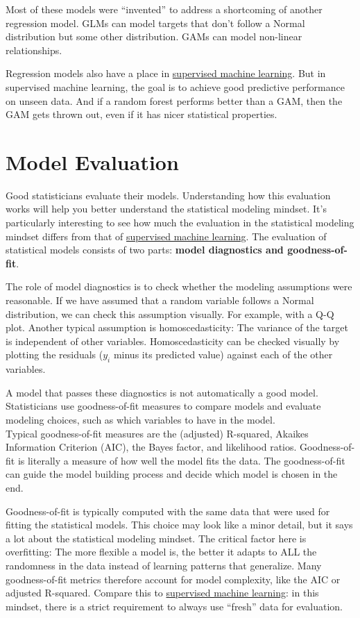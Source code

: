 \documentclass[
  10pt,
]{scrbook}
\begin{document}
Most of these models were ``invented'' to address a shortcoming of another regression model.
GLMs can model targets that don't follow a Normal distribution but some other distribution.
GAMs can model non-linear relationships.

Regression models also have a place in \protect\hyperlink{supervised-ml}{supervised machine learning}.
But in supervised machine learning, the goal is to achieve good predictive performance on unseen data.
And if a random forest performs better than a GAM, then the GAM gets thrown out, even if it has nicer statistical properties.

\hypertarget{model-evaluation}{%
\section{Model Evaluation}\label{model-evaluation}}

Good statisticians evaluate their models.
Understanding how this evaluation works will help you better understand the statistical modeling mindset.
It's particularly interesting to see how much the evaluation in the statistical modeling mindset differs from that of \protect\hyperlink{supervised-ml}{supervised machine learning}.
The evaluation of statistical models consists of two parts: \textbf{model diagnostics and goodness-of-fit}.

The role of model diagnostics is to check whether the modeling assumptions were reasonable.
If we have assumed that a random variable follows a Normal distribution, we can check this assumption visually.
For example, with a Q-Q plot.
Another typical assumption is homoscedasticity: The variance of the target is independent of other variables.
Homoscedasticity can be checked visually by plotting the residuals (\(y_i\) minus its predicted value) against each of the other variables.

A model that passes these diagnostics is not automatically a good model.
Statisticians use goodness-of-fit measures to compare models and evaluate modeling choices, such as which variables to have in the model.\\
Typical goodness-of-fit measures are the (adjusted) R-squared, Akaikes Information Criterion (AIC), the Bayes factor, and likelihood ratios.
Goodness-of-fit is literally a measure of how well the model fits the data.
The goodness-of-fit can guide the model building process and decide which model is chosen in the end.

Goodness-of-fit is typically computed with the same data that were used for fitting the statistical models.
This choice may look like a minor detail, but it says a lot about the statistical modeling mindset.
The critical factor here is overfitting: The more flexible a model is, the better it adapts to ALL the randomness in the data instead of learning patterns that generalize.
Many goodness-of-fit metrics therefore account for model complexity, like the AIC or adjusted R-squared.
Compare this to \protect\hyperlink{supervised-ml}{supervised machine learning}: in this mindset, there is a strict requirement to always use ``fresh'' data for evaluation.
\end{document}
